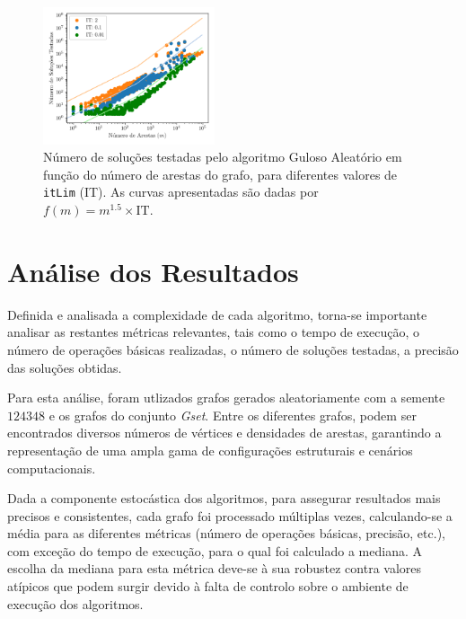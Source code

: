 \documentclass[mirror, portugues]{revdetua}
\begin{document}
\begin{figure}[H]
    \centering
    \includegraphics[width=0.45\textwidth]{../assets/sols_Random Greedy.png}
    \caption{Número de soluções testadas pelo algoritmo Guloso Aleatório em função do número de arestas do grafo, para diferentes valores de \texttt{itLim} (IT). As curvas apresentadas são dadas por $f(m) = m^{1.5} \times \text{IT}$.}
    \label{fig:sols_randomgreedy}
\end{figure}

\section{Análise dos Resultados}


Definida e analisada a complexidade de cada algoritmo, torna-se importante analisar as restantes métricas relevantes, tais como o tempo de execução, o número de operações básicas realizadas, o número de soluções testadas, a precisão das soluções obtidas.

Para esta análise, foram utlizados grafos gerados aleatoriamente com a semente $124348$ e os grafos do conjunto \textit{Gset}. Entre os diferentes grafos, podem ser encontrados diversos números de vértices e densidades de arestas, garantindo a representação de uma ampla gama de configurações estruturais e cenários computacionais.

Dada a componente estocástica dos algoritmos, para assegurar resultados mais precisos e consistentes, cada grafo foi processado múltiplas vezes, calculando-se a média para as diferentes métricas (número de operações básicas, precisão, etc.), com exceção do tempo de execução, para o qual foi calculado a mediana. A escolha da mediana para esta métrica deve-se à sua robustez contra valores atípicos que podem surgir devido à falta de controlo sobre o ambiente de execução dos algoritmos.
\end{document}
